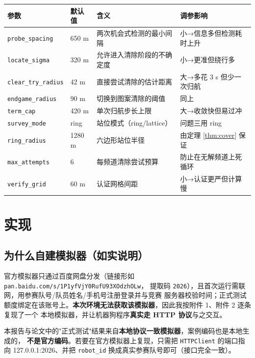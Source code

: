 \begin{center}
\begin{tabular}{llll}
\toprule
参数 & 默认值 & 含义 & 调参影响 \\
\midrule
\texttt{probe\_spacing} & 650 m & 两次机会式检测的最小间隔 & 小→信息多但检测耗时上升 \\
\texttt{locate\_sigma} & 320 m & 允许进入清除阶段的不确定度 & 小→更准但绕行多 \\
\texttt{clear\_try\_radius} & 42 m & 直接尝试清除的估计距离 & 大→多花 3 s 但少一次归航 \\
\texttt{endgame\_radius} & 90 m & 切换到图案清除的阈值 & 同上 \\
\texttt{term\_cap} & 420 m & 单次归航步长上限 & 大→收敛快但易过冲 \\
\texttt{survey\_mode} & ring & 站位模式（ring/lattice） & 问题三用 ring \\
\texttt{ring\_radius} & 1280 m & 六边形站位半径 & 由定理 \ref{thm:cover} 保证 \\
\texttt{max\_attempts} & 6 & 每频道清除尝试预算 & 防止在无解频道上死循环 \\
\texttt{verify\_grid} & 60 m & 认证网格间距 & 小→认证更严但计算慢 \\
\bottomrule
\end{tabular}
\end{center}

\section{实现}

\subsection{为什么自建模拟器（如实说明）}

官方模拟器只通过百度网盘分发（链接形如
\texttt{pan.baidu.com/s/\hspace{0pt}1P1yfVjY0RufU93XOdzhOLw}，
提取码 \texttt{2026}），且首次运行需联网，用参赛队号/队员姓名/手机号注册登录并与竞赛
服务器校验时间；正式测试额度绑定在该账号上。\textbf{本次环境无法获取该模拟器}，因此我按附件 1、附件 2 逐条复现了一个
本地模拟器，并让机器狗程序\textbf{真实走 HTTP 协议}与之交互。

\begin{warnbox}[title=诚实披露]
本报告与论文中的"正式测试"结果来自\textbf{本地协议一致模拟器}，案例编码也是本地生成的，
\textbf{不是官方编码}。若要在官方模拟器上复现，只需把 \texttt{HTTPClient} 的端口指向
127.0.0.1:2026、并把 \texttt{robot\_id} 换成真实参赛队号即可（接口完全一致）。
\end{warnbox}

